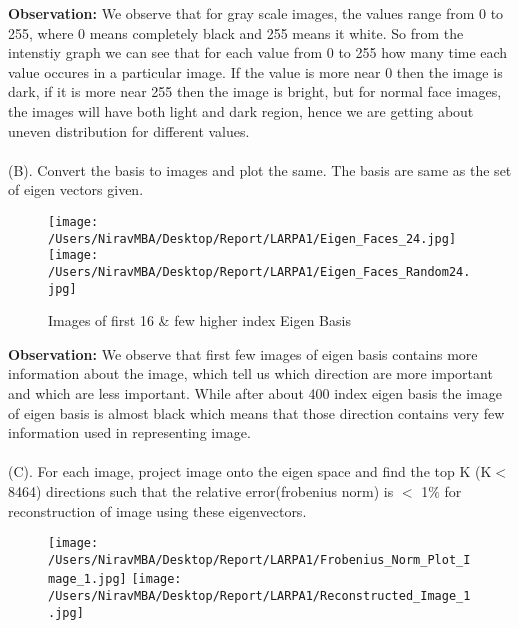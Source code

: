 \documentclass[12pt]{report}
\begin{document}
\noindent
{\bfseries Observation: } 
We observe that for gray scale images, the values range from 0 to 255, where 0 means completely black and 255 means it white. So from the intenstiy graph we can see that for each value from 0 to 255 how many time each value occures in a particular image. If the value is more near 0 then the image is dark, if it is more near 255 then the image is bright, but for normal face images, the images will have both light and dark region, hence we are getting about uneven distribution for different values.\\ \\

\noindent
(B). Convert the basis to images and plot the same. The basis are same as the set of eigen
vectors given.\\




\begin{figure}[H]

	\texttt{[image: /Users/NiravMBA/Desktop/Report/LARPA1/Eigen\_Faces\_24.jpg]}
	\texttt{[image: /Users/NiravMBA/Desktop/Report/LARPA1/Eigen\_Faces\_Random24.jpg]}
	\caption{Images of first 16 \& few higher index Eigen Basis}
\end{figure}

\noindent
{\bfseries Observation: } 
We observe that first few images of eigen basis contains more information about the image, which tell us which direction are more important and which are less important. While after about 400 index eigen basis the image of eigen basis is almost black which means that those direction contains very few information used in representing image.\\ \\

(C). For each image, project image onto the eigen space and find the top K (K$ < $8464)
directions such that the relative error(frobenius norm) is $ < $ 1$ \% $ for reconstruction of image using these eigenvectors.

\begin{figure}[H]
	\centering
	\texttt{[image: /Users/NiravMBA/Desktop/Report/LARPA1/Frobenius\_Norm\_Plot\_Image\_1.jpg]}
	\texttt{[image: /Users/NiravMBA/Desktop/Report/LARPA1/Reconstructed\_Image\_1.jpg]}
	
\end{figure}
\end{document}

